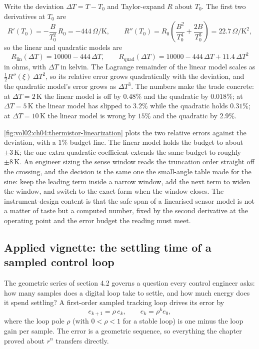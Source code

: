 Write the deviation $\Delta T = T - T_{0}$ and Taylor-expand $R$ about
$T_{0}$. The first two derivatives at $T_{0}$ are
\[
R'(T_{0}) = -\frac{B}{T_{0}^{2}}\,R_{0} = -444\,\Omega/\text{K},
\qquad
R''(T_{0}) = R_{0}\left(\frac{B^{2}}{T_{0}^{4}} + \frac{2B}{T_{0}^{3}}
\right) = 22.7\,\Omega/\text{K}^{2},
\]
so the linear and quadratic models are
\[
R_{\mathrm{lin}}(\Delta T) = 10000 - 444\,\Delta T, \qquad
R_{\mathrm{quad}}(\Delta T) = 10000 - 444\,\Delta T + 11.4\,\Delta T^{2}
\]
in ohms, with $\Delta T$ in kelvin. The Lagrange remainder of the linear
model scales as $\tfrac{1}{2} R''(\xi)\,\Delta T^{2}$, so its relative
error grows quadratically with the deviation, and the quadratic model's
error grows as $\Delta T^{3}$. The numbers make the trade concrete: at
$\Delta T = 2\,\text{K}$ the linear model is off by $0.48\%$ and the
quadratic by $0.018\%$; at $\Delta T = 5\,\text{K}$ the linear model has
slipped to $3.2\%$ while the quadratic holds $0.31\%$; at $\Delta T =
10\,\text{K}$ the linear model is wrong by $15\%$ and the quadratic by
$2.9\%$.



\autoref{fig:vol02:ch04:thermistor-linearization} plots the two relative
errors against the deviation, with a $1\%$ budget line. The linear model
holds the budget to about $\pm 3\,\text{K}$; the one extra quadratic
coefficient extends the same budget to roughly $\pm 8\,\text{K}$. An
engineer sizing the sense window reads the truncation order straight off
the crossing, and the decision is the same one the small-angle table
made for the sine: keep the leading term inside a narrow window, add the
next term to widen the window, and switch to the exact form when the
window closes. The instrument-design content is that the safe span of a
linearised sensor model is not a matter of taste but a computed number,
fixed by the second derivative at the operating point and the error
budget the reading must meet.

\subsection{Applied vignette: the settling time of a sampled control loop}

The geometric series of section 4.2 governs a question every control
engineer asks: how many samples does a digital loop take to settle, and
how much energy does it spend settling? A first-order sampled tracking
loop drives its error by
\[
e_{k+1} = \rho\, e_{k}, \qquad e_{k} = \rho^{k} e_{0},
\]
where the loop pole $\rho$ (with $0 < \rho < 1$ for a stable loop) is
one minus the loop gain per sample. The error is a geometric sequence,
so everything the chapter proved about $r^{n}$ transfers directly.

